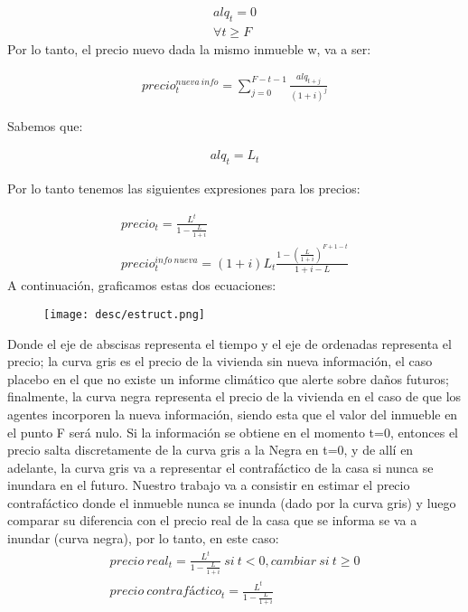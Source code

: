 \documentclass[12pt]{article}
\begin{document}
\begin{align*}
alq_t = 0  \\  \forall  t \geq F  
\end{align*}
Por lo tanto, el precio nuevo dada la mismo inmueble w, va a ser:

\begin{align*}
precio_{t}^{nueva \ info} = \sum_{j=0}^{F-t-1}{\frac{alq_{t+j}}{(1+i)^j}}
\end{align*}

Sabemos que:

\begin{align*}
alq_t = L_t
\end{align*}

Por lo tanto tenemos las siguientes expresiones para los precios:

\begin{align*}
precio_t = \frac{L^t}{1-\frac{L}{1+i}}
\\
precio_{t}^{info \ nueva} =(1+i)L_t \frac{1 - (\frac{L}{1+i})^{F+1-t}}{1+i-L}
\end{align*}
A continuación, graficamos estas dos ecuaciones:

\begin{figure}[H]
\centering
\texttt{[image: desc/estruct.png]}
\end{figure}

Donde el eje de abscisas representa el tiempo y el eje de ordenadas representa el precio; la curva gris es el precio de la vivienda sin nueva información, el caso placebo en el que no existe un informe climático que alerte sobre daños futuros; finalmente, la curva negra representa el precio de la vivienda en el caso de que los agentes incorporen la nueva información, siendo esta que el valor del inmueble en el punto F será nulo. Si la información se obtiene en el momento t=0, entonces el precio salta discretamente de la curva gris a la Negra en t=0, y de allí en adelante, la curva gris va a representar el contrafáctico de la casa si nunca se inundara en el futuro. 
Nuestro trabajo va a consistir en estimar el precio contrafáctico donde el inmueble nunca se inunda (dado por la curva gris) y luego comparar su diferencia con el precio real de la casa que se informa se va a inundar (curva negra), por lo tanto, en este caso:
\begin{align*}
precio \ real_{t} = \frac{L^t}{1-\frac{L}{1+i}}   \    si \ t < 0 ,cambiar \ si \ t \geq 0  %
\\
precio \ contrafáctico_t = \frac{L^t}{1-\frac{L}{1+i}} 
\end{align*}
\end{document}
